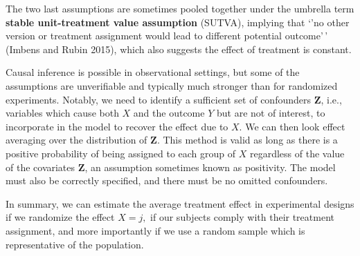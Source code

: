 \documentclass[
  11pt,
  letterpaper,
]{scrbook}
\theoremstyle{definition}
\theoremstyle{definition}
\theoremstyle{remark}
\begin{document}
The two last assumptions are sometimes pooled together under the
umbrella term \textbf{stable unit-treatment value assumption} (SUTVA),
implying that `'no other version or treatment assignment would lead to
different potential outcome'\,' (Imbens and Rubin 2015), which also
suggests the effect of treatment is constant.

\begin{tcolorbox}[enhanced jigsaw, left=2mm, leftrule=.75mm, coltitle=black, breakable, bottomrule=.15mm, colframe=quarto-callout-caution-color-frame, titlerule=0mm, colbacktitle=quarto-callout-caution-color!10!white, rightrule=.15mm, toprule=.15mm, title=\textcolor{quarto-callout-caution-color}{\faFire}\hspace{0.5em}{Conditional ignorability for observational data}, opacityback=0, toptitle=1mm, bottomtitle=1mm, arc=.35mm, opacitybacktitle=0.6, colback=white]

Causal inference is possible in observational settings, but some of the
assumptions are unverifiable and typically much stronger than for
randomized experiments. Notably, we need to identify a sufficient set of
confounders \(\boldsymbol{Z}\), i.e., variables which cause both \(X\)
and the outcome \(Y\) but are not of interest, to incorporate in the
model to recover the effect due to \(X\). We can then look effect
averaging over the distribution of \(\boldsymbol{Z}\). This method is
valid as long as there is a positive probability of being assigned to
each group of \(X\) regardless of the value of the covariates
\(\boldsymbol{Z}\), an assumption sometimes known as positivity. The
model must also be correctly specified, and there must be no omitted
confounders.

\end{tcolorbox}

In summary, we can estimate the average treatment effect in experimental
designs if we randomize the effect \(X=j,\) if our subjects comply with
their treatment assignment, and more importantly if we use a random
sample which is representative of the population.
\end{document}
